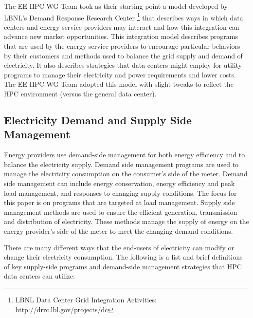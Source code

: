 The EE HPC WG Team took as their starting point a model developed by LBNL's 
Demand Response Research Center \footnote{LBNL
Data Center Grid Integration Activities: http://drrc.lbl.gov/projects/dc} that
describes ways in which data centers and energy service providers may
interact and how this integration can advance new market opportunities. This
integration model describes programs that are used by the energy service
providers to encourage particular behaviors by their customers and methods used
to balance the grid supply and demand of electricity. It also describes
strategies that data centers might employ for utility programs to manage their
electricity and power requirements and lower costs. The EE HPC WG Team adopted
this model with slight tweaks to reflect the HPC environment (versus the
general data center).


\subsection{Electricity Demand and Supply Side Management}

Energy providers use demand-side management for both energy efficiency and to balance the electricity supply. 
Demand side management programs are used to manage the electricity consumption on the consumer’s side of the meter.  
Demand side management can include energy conservation, energy efficiency and peak load management, and responses to 
changing supply conditions.  The focus for this paper is on programs that are targeted at load management. 
Supply side management methods are used to ensure the efficient generation, transmission and distribution of 
electricity.  These methods 
manage the supply of energy on the energy provider’s side of the meter to meet the changing demand conditions. 

There are many different ways that the end-users of electricity can modify or change their electricity consumption. 
The following is a list and 
brief definitions of key supply-side programs and demand-side management strategies that HPC data centers can utilize:



